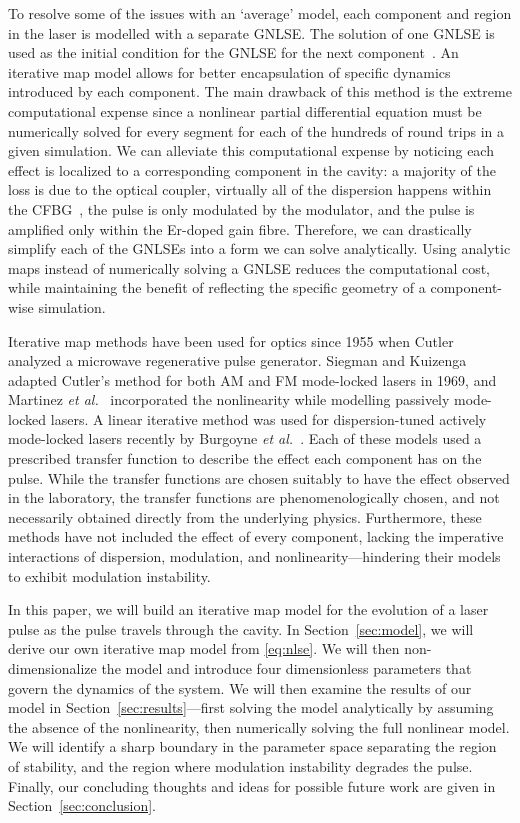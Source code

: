 \documentclass[9pt,twocolumn,twoside]{osajnl}
\begin{document}
To resolve some of the issues with an `average' model, each component and region in the laser is modelled with a separate GNLSE. The solution of one GNLSE is used as the initial condition for the GNLSE for the next component~\cite{lapre2019, meng2020, oktem2010, woodward2018}. An iterative map model allows for better encapsulation of specific dynamics introduced by each component. The main drawback of this method is the extreme computational expense since a nonlinear partial differential equation must be numerically solved for every segment for each of the hundreds of round trips in a given simulation. We can alleviate this computational expense by noticing each effect is localized to a corresponding component in the cavity: a majority of the loss is due to the optical coupler, virtually all of the dispersion happens within the CFBG~\cite{agrawal2002}, the pulse is only modulated by the modulator, and the pulse is amplified only within the Er-doped gain fibre. Therefore, we can drastically simplify each of the GNLSEs into a form we can solve analytically. Using analytic maps instead of numerically solving a GNLSE reduces the computational cost, while maintaining the benefit of reflecting the specific geometry of a component-wise simulation.

Iterative map methods have been used for optics since 1955 when Cutler~\cite{cutler1955} analyzed a microwave regenerative pulse generator. Siegman and Kuizenga~\cite{kuizenga1970a, kuizenga1970b, kuizenga1970, siegman1969} adapted Cutler's method for both AM and FM mode-locked lasers in 1969, and Martinez \emph{et al.}~\cite{martinez1984, martinez1985} incorporated the nonlinearity while modelling passively mode-locked lasers. A linear iterative method was used for dispersion-tuned actively mode-locked lasers recently by Burgoyne \emph{et al.}~\cite{burgoyne2014}. Each of these models used a prescribed transfer function to describe the effect each component has on the pulse. While the transfer functions are chosen suitably to have the effect observed in the laboratory, the transfer functions are phenomenologically chosen, and not necessarily obtained directly from the underlying physics. Furthermore, these methods have not included the effect of every component, lacking the imperative interactions of dispersion, modulation, and nonlinearity---hindering their models to exhibit modulation instability.

In this paper, we will build an iterative map model for the evolution of a laser pulse as the pulse travels through the cavity. In Section~\ref{sec:model}, we will derive our own iterative map model from \eqref{eq:nlse}. We will then non-dimensionalize the model and introduce four dimensionless parameters that govern the dynamics of the system. We will then examine the results of our model in Section~\ref{sec:results}---first solving the model analytically by assuming the absence of the nonlinearity, then numerically solving the full nonlinear model. We will identify a sharp boundary in the parameter space separating the region of stability, and the region where modulation instability degrades the pulse. Finally, our concluding thoughts and ideas for possible future work are given in Section~\ref{sec:conclusion}.
\end{document}
